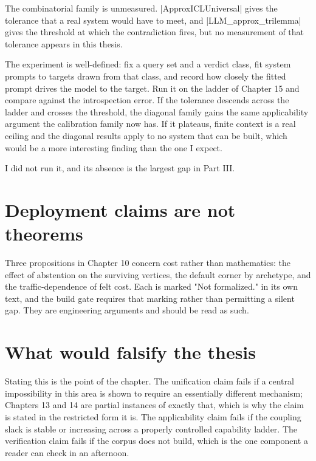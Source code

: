 \documentclass{memoir}
\begin{document}
The combinatorial family is unmeasured. \LeanVerb|ApproxICLUniversal| gives the
tolerance that a real system would have to meet, and \LeanVerb|LLM_approx_trilemma| gives
the threshold at which the contradiction fires, but no measurement of that
tolerance appears in this thesis.

The experiment is well-defined: fix a query set and a verdict class, fit system
prompts to targets drawn from that class, and record how closely the fitted
prompt drives the model to the target. Run it on the ladder of Chapter 15 and
compare against the introspection error. If the tolerance descends across the
ladder and crosses the threshold, the diagonal family gains the same
applicability argument the calibration family now has. If it plateaus, finite
context is a real ceiling and the diagonal results apply to no system that can
be built, which would be a more interesting finding than the one I expect.

I did not run it, and its absence is the largest gap in Part III.



\section{Deployment claims are not theorems}\label{Two--Schemas--of--Impossibility-005F-005F-005F--Machine--Checked--Limits--of--Trustworthy--Machine--Learning-005F-005F-005F--and--Why--They--Tighten--with--Capability----Limitations----Deployment--claims--are--not--theorems}

Three propositions in Chapter 10 concern cost rather than mathematics: the
effect of abstention on the surviving vertices, the default corner by archetype,
and the traffic-dependence of felt cost. Each is marked "Not formalized." in its
own text, and the build gate requires that marking rather than permitting a
silent gap. They are engineering arguments and should be read as such.



\section{What would falsify the thesis}\label{Two--Schemas--of--Impossibility-005F-005F-005F--Machine--Checked--Limits--of--Trustworthy--Machine--Learning-005F-005F-005F--and--Why--They--Tighten--with--Capability----Limitations----What--would--falsify--the--thesis}

Stating this is the point of the chapter. The unification claim fails if a
central impossibility in this area is shown to require an essentially different
mechanism; Chapters 13 and 14 are partial instances of exactly that, which is
why the claim is stated in the restricted form it is. The applicability claim
fails if the coupling slack is stable or increasing across a properly controlled
capability ladder. The verification claim fails if the corpus does not build,
which is the one component a reader can check in an afternoon.
\end{document}
